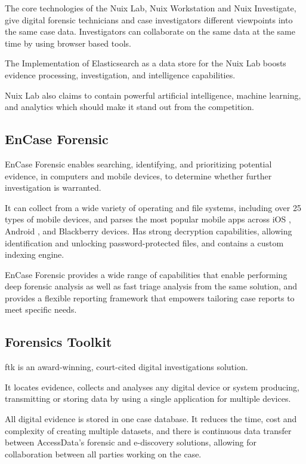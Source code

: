 The core technologies of the Nuix Lab, Nuix Workstation and Nuix Investigate, give digital forensic technicians and case investigators 
different viewpoints into the same case data. Investigators can collaborate on 
the same data at the same time by using browser based tools.

The Implementation of Elasticsearch \cite{elasticsearch} as a data store for the Nuix Lab boosts evidence processing, investigation, and intelligence capabilities. 

Nuix Lab also claims to contain powerful artificial intelligence, machine learning, and analytics which should make it stand out from the competition. 

\subsection{EnCase Forensic}

EnCase Forensic \cite{encase} enables searching, identifying, and prioritizing potential evidence, in computers and mobile devices, to determine whether 
further investigation is warranted.

It can collect from a wide variety of operating and file systems, including over 25 types of mobile devices, and parses the most popular mobile apps across iOS \cite{ios}, Android \cite{android}, and Blackberry \cite{blackberry} devices.
Has strong decryption capabilities, allowing identification and unlocking password-protected files, and contains a custom indexing engine.

EnCase Forensic provides a wide range of capabilities that enable performing deep forensic analysis as well as fast triage analysis from the same solution, and provides a flexible
reporting framework that empowers tailoring case reports to meet specific needs.

\subsection{Forensics Toolkit}

\acrfull{ftk} \cite{ftk} is an award-winning, court-cited digital investigations solution. 

It locates evidence, collects and analyses any digital device or system producing, transmitting or 
storing data by using a single application for multiple devices.

All digital evidence is stored in one case database. It reduces the time, cost and complexity of creating multiple datasets, and there is continuous data transfer between AccessData's forensic 
and e-discovery solutions, allowing for collaboration between all parties working on the case. 

